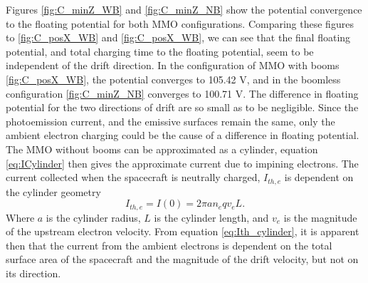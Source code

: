 Figures \ref{fig:C_minZ_WB} and \ref{fig:C_minZ_NB} show the potential convergence to the floating potential for both MMO configurations. Comparing these figures to \ref{fig:C_posX_WB} and \ref{fig:C_posX_WB}, we can see that the final floating potential, and total charging time to the floating potential, seem to be independent of the drift direction. In the configuration of MMO with booms \ref{fig:C_posX_WB}, the potential converges to 105.42 V, and in the boomless configuration \ref{fig:C_minZ_NB} converges to 100.71 V. The difference in floating potential for the two directions of drift are so small as to be negligible. Since the photoemission current, and the emissive surfaces remain the same, only the ambient electron charging could be the cause of a difference in floating potential. The MMO without booms can be approximated as a cylinder, equation \eqref{eq:ICylinder} then gives the approximate current due to impining electrons. The current collected when the spacecraft is neutrally charged, $I_{th,e}$ is dependent on the cylinder geometry \parencite{LAI2019}
\begin{equation}\label{eq:Ith_cylinder}
    I_{th,e} = I(0) = 2 \pi a n_e q v_e L.    
\end{equation}
Where $a$ is the cylinder radius, $L$ is the cylinder length, and $v_e$ is the magnitude of the upstream electron velocity. From equation \eqref{eq:Ith_cylinder}, it is apparent then that the current from the ambient electrons is dependent on the total surface area of the spacecraft and the magnitude of the drift velocity, but not on its direction.

